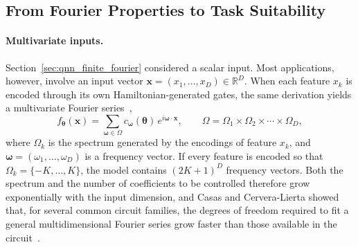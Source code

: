\documentclass[12pt]{article}
\numberwithin{equation}{section}  %
\begin{document}
\subsection{From Fourier Properties to Task Suitability}
\label{sec:app_criteria}

\paragraph{Multivariate inputs.} Section~\ref{sec:qnn_finite_fourier} considered a scalar input. Most applications, however, involve an input vector $\mathbf{x} = (x_1, \ldots, x_D) \in \mathbb{R}^D$. When each feature $x_k$ is encoded through its own Hamiltonian-generated gates, the same derivation yields a multivariate Fourier series~\cite{schuld2021effect, casas2023multidimensional},
\begin{equation}
f_{\boldsymbol{\theta}}(\mathbf{x}) = \sum_{\boldsymbol{\omega} \in \Omega} c_{\boldsymbol{\omega}}(\boldsymbol{\theta})\, e^{i\boldsymbol{\omega} \cdot \mathbf{x}},
\qquad
\Omega = \Omega_1 \times \Omega_2 \times \cdots \times \Omega_D,
\label{eq:multivariate_fourier}
\end{equation}
where $\Omega_k$ is the spectrum generated by the encodings of feature $x_k$, and $\boldsymbol{\omega} = (\omega_1, \ldots, \omega_D)$ is a frequency vector. If every feature is encoded so that $\Omega_k = \{-K, \ldots, K\}$, the model contains $(2K+1)^D$ frequency vectors. Both the spectrum and the number of coefficients to be controlled therefore grow exponentially with the input dimension, and Casas and Cervera-Lierta showed that, for several common circuit families, the degrees of freedom required to fit a general multidimensional Fourier series grow faster than those available in the circuit~\cite{casas2023multidimensional}.
\end{document}
